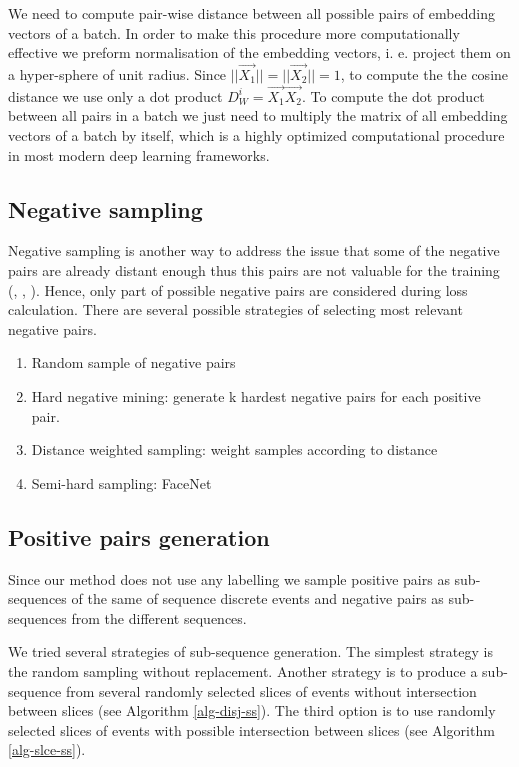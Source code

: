 \documentclass[sigconf]{acmart}
\begin{document}
We need to compute pair-wise distance between all possible pairs of embedding vectors of a batch. In order to make this procedure more computationally effective we preform normalisation of the embedding vectors, i. e. project them on a hyper-sphere of unit radius. Since $||\vec{X_1}||= ||\vec{X_2}||=1$, to compute the the cosine distance we use only a dot product $D_W^i =\vec{X_1}\vec{X_2}$. To compute the dot product between all pairs in a batch we just need to multiply the matrix of all embedding vectors of a batch by itself, which is a highly optimized computational procedure in most modern deep learning frameworks.

\subsection{Negative sampling} \label{sec-neg-samples}

Negative sampling is another way to address the issue that some of the negative pairs are already distant enough thus this pairs are not valuable for the training (\cite{simo2015discriminative}, \cite{wu2017sampling}, \cite{Schroff2015FaceNetAU}). Hence, only part of possible negative pairs are considered during loss calculation. There are several possible strategies of selecting most relevant negative pairs.

\begin{enumerate}
    \item Random sample of negative pairs
    \item Hard negative mining: generate k hardest negative pairs for each positive pair.
    \item Distance weighted sampling: weight samples according to distance \cite{wu2017sampling}
    \item Semi-hard sampling: FaceNet\cite{Schroff2015FaceNetAU} 
\end{enumerate}

\subsection{Positive pairs generation} \label{sec-pos-pairs}

Since our method does not use any labelling we sample positive pairs as sub-sequences of the same of sequence discrete events and negative pairs as sub-sequences from the different sequences.

We tried several strategies of sub-sequence generation. The simplest strategy is the random sampling without replacement. Another strategy is to produce a sub-sequence from several randomly selected slices of events without intersection between slices (see Algorithm \ref{alg-disj-ss}). The third option is to use randomly selected slices of events with possible intersection between slices (see Algorithm \ref{alg-slce-ss}). 
\end{document}
